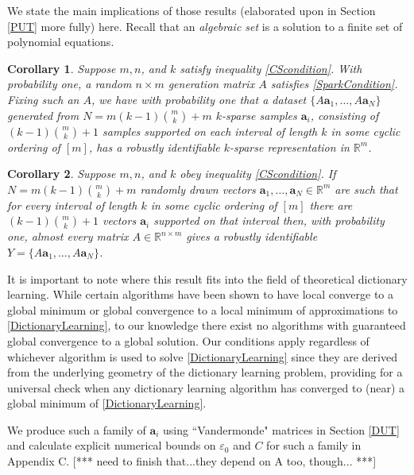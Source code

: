 \documentclass[journal, onecolumn]{IEEEtran}
\newtheorem{corollary}{Corollary}
\begin{document}
We state the main implications of those results (elaborated upon in Section \ref{PUT} more fully) here. Recall that an \emph{algebraic set} is a solution to a finite set of polynomial equations.

\begin{corollary}
Suppose $m, n$, and $k$ satisfy inequality \eqref{CScondition}. With probability one, a random $n \times m$ generation matrix $A$ satisfies \eqref{SparkCondition}. Fixing such an $A$, we have with probability one that a dataset $\{A\mathbf{a}_1, \ldots , A\mathbf{a}_N\}$ generated from $N = m(k-1){m \choose k}+m$ $k$-sparse samples $\mathbf{a}_i$, consisting of $(k-1){m \choose k}+1$ samples supported on each interval of length $k$ in some cyclic ordering of $[m]$, has a robustly identifiable $k$-sparse representation in $\mathbb{R}^m$.
\end{corollary}

\begin{corollary}
Suppose $m, n$, and $k$ obey inequality \eqref{CScondition}.  If $N = m(k-1){m \choose k}+m$ randomly drawn vectors $\mathbf{a}_1, \ldots, \mathbf{a}_N \in \mathbb{R}^m$ are such that for every interval of length $k$ in some cyclic ordering of $[m]$ there are $(k-1){m \choose k}+1$ vectors $\mathbf{a}_i$ supported on that interval then, with probability one, almost every matrix $A \in \mathbb{R}^{n \times m}$ gives a robustly identifiable $Y = \{A\mathbf{a}_1, \ldots , A\mathbf{a}_N \}$.
\end{corollary}

It is important to note where this result fits into the field of theoretical dictionary learning. While certain algorithms have been shown to have local converge to a global minimum or global convergence to a local minimum of approximations to \eqref{DictionaryLearning}, to our knowledge there exist no algorithms with guaranteed global convergence to a global solution. Our conditions apply regardless of whichever algorithm is used to solve \eqref{DictionaryLearning} since they are derived from the underlying geometry of the dictionary learning problem, providing for a universal check when any dictionary learning algorithm has converged to (near) a global minimum of \eqref{DictionaryLearning}.




We produce such a family of $\mathbf{a}_i$ using ``Vandermonde" matrices in Section \ref{DUT} and calculate explicit numerical bounds on $\varepsilon_0$ and $C$ for such a family in Appendix C. [*** need to finish that...they depend on A too, though... ***] 
\end{document}
